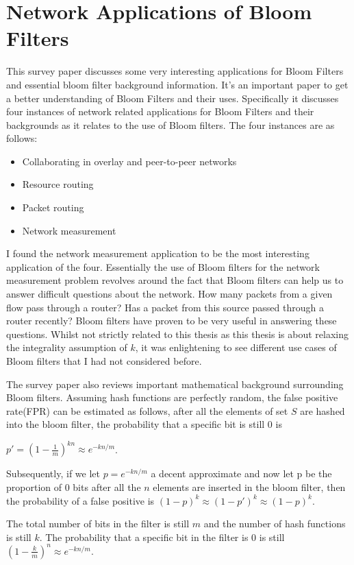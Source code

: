 \documentclass[MScCS]{uccthesis}
\begin{document}
\section{Network Applications of Bloom Filters}
This survey paper\cite{broder2004network} discusses some very interesting applications for Bloom Filters and essential bloom filter background information. It's an important paper to get a better understanding of Bloom Filters and their uses. Specifically it discusses four instances of network related applications for Bloom Filters and their backgrounds as it relates to the use of Bloom filters. The four instances are as follows:
\begin{itemize}
    \item Collaborating in overlay and peer-to-peer networks
    \item Resource routing
    \item Packet routing
    \item Network measurement
\end{itemize}
I found the network measurement application to be the most interesting application of the four. Essentially the use of Bloom filters for the network measurement problem revolves around the fact that Bloom filters can help us to answer difficult questions about the network. How many packets from a given flow pass through a router? Has a packet from this source passed through a router recently? Bloom filters have proven to be very useful in answering these questions. Whilst not strictly related to this thesis as this thesis is about relaxing the integrality assumption of $k$, it was enlightening to see different use cases of Bloom filters that I had not considered before.

The survey paper also reviews important mathematical background surrounding Bloom filters. Assuming hash functions are perfectly random, the false positive rate(FPR) can be estimated as follows, after all the elements of set $S$ are hashed into the bloom filter, the probability that a specific bit is still 0 is

$ p ' = (1 - \frac{1}{m})^{kn} \approx e ^{-kn/m}$.

Subsequently, if we let $p = e ^{-kn/m}$ a decent approximate and now let p be the proportion of 0 bits after all the $n$ elements are inserted in the bloom filter, then the probability of a false positive is $(1-p)^k \approx (1-p')^k \approx (1-p)^k$.

The total number of bits in the filter is still $m$ and the number of hash functions is still $k$. The probability that a specific bit in the filter is 0 is still $(1-\frac{k}{m})^n \approx e^{-kn/m}$.
\end{document}
